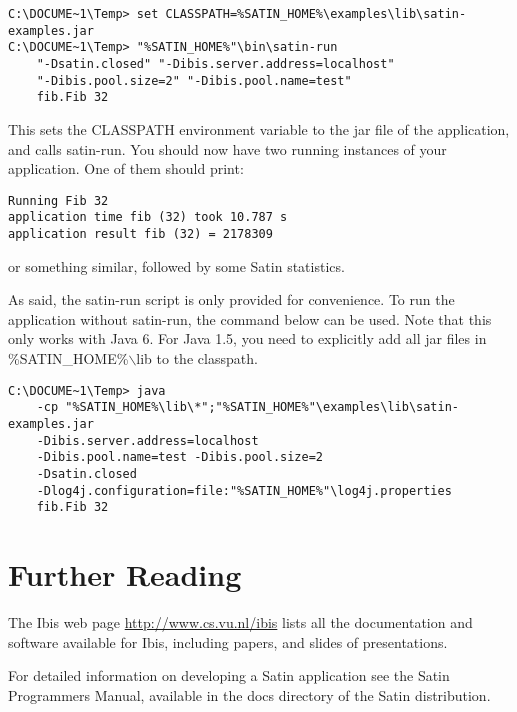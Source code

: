 \documentclass[a4paper,10pt]{article}
\begin{document}
\noindent
{\small
\begin{verbatim}
C:\DOCUME~1\Temp> set CLASSPATH=%SATIN_HOME%\examples\lib\satin-examples.jar
C:\DOCUME~1\Temp> "%SATIN_HOME%"\bin\satin-run
    "-Dsatin.closed" "-Dibis.server.address=localhost"
    "-Dibis.pool.size=2" "-Dibis.pool.name=test"
    fib.Fib 32
\end{verbatim}
}
\noindent

This sets the CLASSPATH environment variable to the jar file of the
application, and calls satin-run. You should now have two running
instances of your application. One of them should print:

\noindent
{\small
\begin{verbatim}
Running Fib 32
application time fib (32) took 10.787 s
application result fib (32) = 2178309
\end{verbatim}
}
\noindent

or something similar, followed by some Satin statistics.

As said, the satin-run script is only provided for convenience. To run
the application without satin-run, the command below can be used.
Note that this only works with Java 6. For Java 1.5, you need to
explicitly add all jar files in \%SATIN\_HOME\%$\backslash$lib to the classpath.

\noindent
{\small
\begin{verbatim}
C:\DOCUME~1\Temp> java
    -cp "%SATIN_HOME%\lib\*";"%SATIN_HOME%"\examples\lib\satin-examples.jar
    -Dibis.server.address=localhost
    -Dibis.pool.name=test -Dibis.pool.size=2
    -Dsatin.closed
    -Dlog4j.configuration=file:"%SATIN_HOME%"\log4j.properties
    fib.Fib 32
\end{verbatim}
}
\noindent

\section{Further Reading}

The Ibis web page \url{http://www.cs.vu.nl/ibis} lists all
the documentation and software available for Ibis, including papers, and
slides of presentations.

For detailed information on developing a Satin application see the
Satin Programmers Manual, available in the docs directory of the Satin
distribution.
\end{document}

